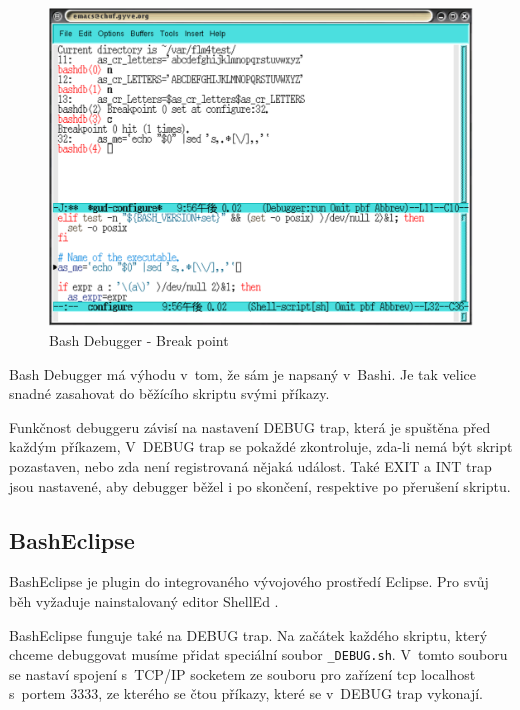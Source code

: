 \documentclass[thesis=M,czech]{FITthesis}[2012/06/26]
\begin{document}
\begin{figure}[htb]\centering
	\includegraphics[width=\textwidth]{./images/bashdb-break_invert}
	\caption{Bash Debugger - Break point}
	\label{fig:bashdb}
\end{figure}

Bash Debugger má výhodu v~tom, že sám je napsaný v~Bashi. Je tak velice snadné zasahovat do běžícího skriptu svými příkazy.

Funkčnost debuggeru závisí na nastavení DEBUG trap, která je spuštěna před každým příkazem, V~DEBUG trap se pokaždé zkontroluje, zda-li nemá být skript pozastaven, nebo zda není registrovaná nějaká událost. Také EXIT a INT trap jsou nastavené, aby debugger běžel i po skončení, respektive po přerušení skriptu.





\subsection{BashEclipse}

BashEclipse \cite{basheclipse} je plugin do integrovaného vývojového prostředí Eclipse. Pro svůj běh vyžaduje nainstalovaný editor ShellEd \cite{shelled}.

BashEclipse funguje také na DEBUG trap. Na začátek každého skriptu, který chceme debuggovat musíme přidat speciální soubor \texttt{\_DEBUG.sh}. V~tomto souboru se nastaví spojení s~TCP/IP socketem ze souboru pro zařízení tcp localhost s~portem 3333, ze kterého se čtou příkazy, které se v~DEBUG trap vykonají.
\end{document}
